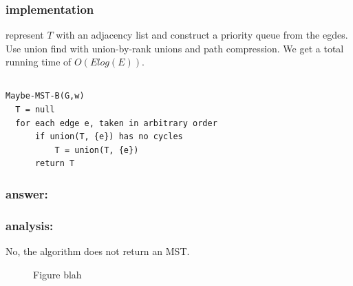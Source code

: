 \documentclass[titlepage]{article}
\theoremstyle{definition}
\begin{document}
    \subsubsection{implementation}
      represent $T$ with an adjacency list and construct a priority queue from
      the egdes. Use union find with union-by-rank unions and path compression.
      We get a total running time of $O\left(E log(E)\right)$.


\subsection{}
\begin{lstlisting}
Maybe-MST-B(G,w)
  T = null
  for each edge e, taken in arbitrary order
	  if union(T, {e}) has no cycles
		  T = union(T, {e})
	  return T
\end{lstlisting}
  \subsubsection{answer: }
  \subsubsection{analysis: }
    No, the algorithm does not return an MST. 
      
    \usetikzlibrary{arrows}
    \begin{figure}
      \begin{center}
      \end{center}
    \caption{Figure blah}
    \label{fig:mst}
    \end{figure}
\end{document}

